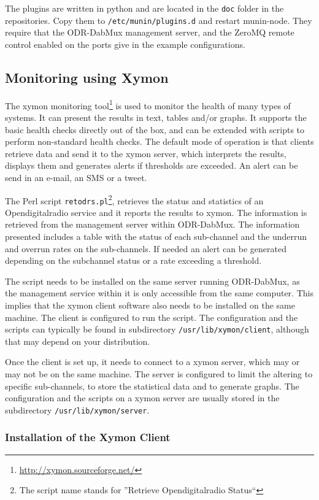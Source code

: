 The plugins are written in python and are located in the \verb+doc+ folder in
the repositories. Copy them to \texttt{/etc/munin/plugins.d} and restart
munin-node. They require that the ODR-DabMux management
server, and the ZeroMQ remote control enabled on the ports give in the example
configurations.


\subsection{Monitoring using Xymon}
The xymon monitoring tool\footnote{\url{http://xymon.sourceforge.net/}} is used
to monitor the health of many types of systems. It can present the results in
text, tables and/or graphs. It supports the basic health checks directly out of
the box, and can be extended with scripts to perform non-standard health checks.
The default mode of operation is that clients retrieve data and send it to the
xymon server, which interprets the results, displays them and generates alerts
if thresholds are exceeded. An alert can be send in an e-mail, an SMS or a
tweet.

The Perl script \verb+retodrs.pl+\footnote{The script name stands for
''Retrieve Opendigitalradio Status``}, retrieves the status and
statistics of an Opendigitalradio service and it reports the results to xymon.
The information is retrieved from the management server within ODR-DabMux. The
information presented includes a table with the status of each sub-channel and
the underrun and overrun rates on the sub-channels. If needed an alert can be
generated depending on the subchannel status or a rate exceeding a threshold.

The script needs to be installed on the same server running ODR-DabMux, as the
management service within it is only accessible from the same computer. This
implies that the xymon client software also needs to be installed on the same
machine. The client is configured to run the script.
The configuration and the scripts can typically be found in subdirectory
\verb+/usr/lib/xymon/client+, although that may depend on your distribution.

Once the client is set up, it needs to connect to a xymon server, which may or
may not be on the same machine.
The server is configured to limit the altering to specific sub-channels, to
store the statistical data and to generate graphs.
The configuration and the scripts on a xymon server are usually stored in the
subdirectory \verb+/usr/lib/xymon/server+.


\subsubsection{Installation of the Xymon Client}

